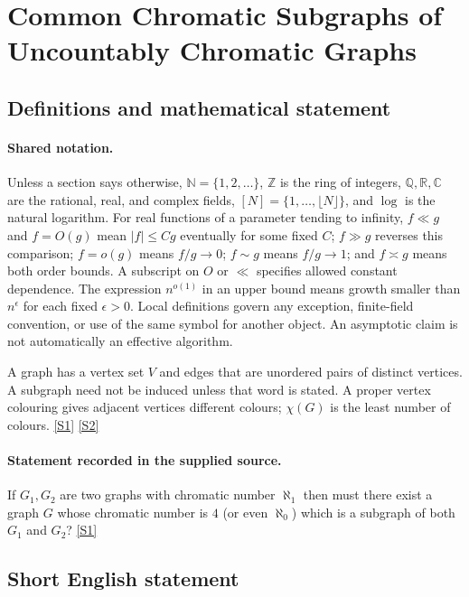 \documentclass[11pt,a4paper]{article}
\newcommand{\N}{\mathbb{N}}
\newcommand{\Z}{\mathbb{Z}}
\newcommand{\Q}{\mathbb{Q}}
\newcommand{\R}{\mathbb{R}}
\newcommand{\C}{\mathbb{C}}
\newcommand{\sref}[2]{\hyperlink{source:#1:#2}{[S#2]}}
\begin{document}
\section{Common Chromatic Subgraphs of Uncountably Chromatic Graphs}\label{statement}


\subsection{Definitions and mathematical statement}

\paragraph{Shared notation.}Unless a section says otherwise, $\N=\{1,2,\ldots\}$,
$\Z$ is the ring of integers, $\Q,\R,\C$ are the rational, real, and complex
fields, $[N]=\{1,\ldots,\lfloor N\rfloor\}$, and $\log$ is the natural
logarithm. For real functions of a parameter tending to infinity,
$f\ll g$ and $f=O(g)$ mean $|f|\leq Cg$ eventually for some fixed $C$;
$f\gg g$ reverses this comparison; $f=o(g)$ means $f/g\to0$;
$f\sim g$ means $f/g\to1$; and $f\asymp g$ means both order bounds.
A subscript on $O$ or $\ll$ specifies allowed constant dependence.
The expression $n^{o(1)}$ in an upper bound means growth smaller than
$n^\epsilon$ for each fixed $\epsilon>0$. Local definitions govern any
exception, finite-field convention, or use of the same symbol for another
object. An asymptotic claim is not automatically an effective algorithm.



A graph has a vertex set $V$ and edges that are unordered pairs of distinct vertices. A subgraph need not be induced unless that word is stated. A proper vertex colouring gives adjacent vertices different colours; $\chi(G)$ is the least number of colours. \sref{statement}{1} \sref{statement}{2}

\paragraph{Statement recorded in the supplied source.}
If $G_1,G_2$ are two graphs with chromatic number $\aleph_1$ then must there exist a graph $G$ whose chromatic number is $4$ (or even $\aleph_0$) which is a subgraph of both $G_1$ and $G_2$? \sref{statement}{1}

\subsection{Short English statement}
\end{document}
